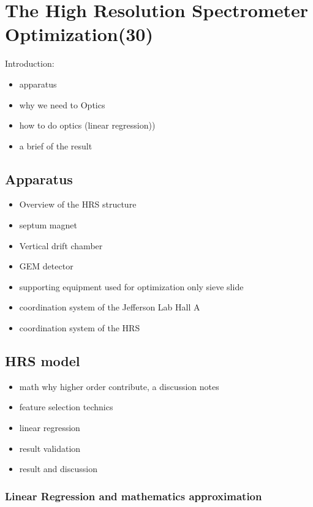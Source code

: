   \chapter{The High Resolution Spectrometer Optimization(30)}

Introduction:
\begin{itemize}
    \item apparatus
    \item why we need to Optics 
    \item how to do optics (linear regression))
    \item a brief of the result
\end{itemize}


\section{Apparatus}

\begin{itemize}
    \item Overview of the HRS structure
    \item septum magnet 
    \item Vertical drift chamber 
    \item GEM detector
    \item supporting equipment used for optimization only sieve slide

    \item coordination system of the Jefferson Lab Hall A
    \item coordination system of the HRS
\end{itemize}


\section{HRS model}

\begin{itemize}
    \item math why higher order contribute, a discussion notes
    \item feature selection technics
    \item linear regression
    \item result validation
    \item result and discussion
\end{itemize}

\subsection{Linear Regression and mathematics approximation}






